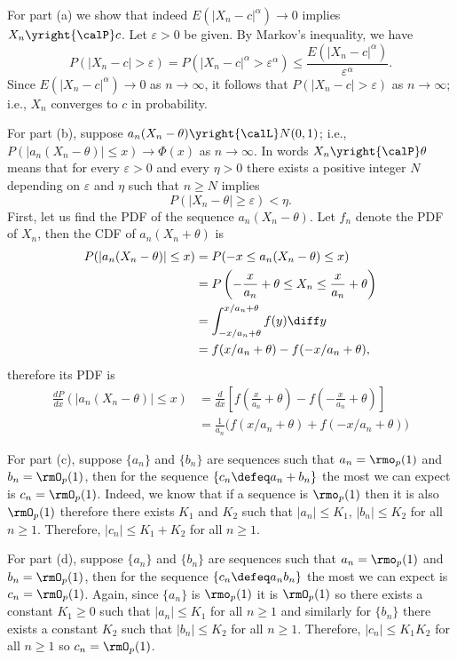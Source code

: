 \begin{solution}
  For part (a) we show that indeed \(E(|X_n-c|^\alpha)\to 0\) implies
  \(X_n\yright{\calP}c\). Let \(\varepsilon>0\) be given. By Markov's
  inequality, we have
  \[
    P(|X_n-c|>\varepsilon)=
    P(|X_n-c|^\alpha>\varepsilon^\alpha)
    \leq\frac{E(|X_n-c|^\alpha)}{\varepsilon^\alpha}.
  \]
  Since \(E(|X_n-c|^\alpha)\to 0\) as \(n\to\infty\), it follows that
  \(P(|X_n-c|>\varepsilon)\) as \(n\to\infty\); i.e., \(X_n\) converges to
  \(c\) in probability.

  For part (b), suppose \(a_n(X_n-\theta)\yright{\calL}N(0,1)\); i.e.,
  \(P(|a_n(X_n-\theta)|\leq x)\to\Phi(x)\) as \(n\to\infty\). In words
  \(X_n\yright{\calP}\theta\) means that for every \(\varepsilon>0\) and
  every \(\eta>0\) there exists a positive integer \(N\) depending on
  \(\varepsilon\) and \(\eta\) such that \(n\geq N\) implies
  \[
    P(|X_n-\theta|\geq\varepsilon)<\eta.
  \]
  First, let us find the PDF of the sequence \(a_n(X_n-\theta)\). Let \(f_n\)
  denote the PDF of \(X_n\), then the CDF of \(a_n(X_n+\theta)\) is
  \begin{align*}
    P(|a_n(X_n-\theta)|\leq x)
    &=P(-x\leq a_n(X_n-\theta)\leq x)\\
    &=P\left(-\frac{x}{a_n}+\theta\leq X_n\leq\frac{x}{a_n}+\theta\right)\\
    &=\int_{-x/a_n+\theta}^{x/a_n+\theta} f(y)\diff y\\
    &=f(x/a_n+\theta)
      -f(-x/a_n+\theta),
  \end{align*}
  therefore its PDF is
  \begin{align*}
    \frac{dP}{dx}(|a_n(X_n-\theta)|\leq x)
    &=\frac{d}{dx}
      \left[%
      f\left(\frac{x}{a_n}+\theta\right)%
      -f\left(-\frac{x}{a_n}+\theta\right)%
      \right]\\
    &=\frac{1}{a_n}\bigl(f(x/a_n+\theta)+f(-x/a_n+\theta)\bigr)
  \end{align*}

  For part (c), suppose \(\{a_n\}\) and \(\{b_n\}\) are sequences such that
  \(a_n=\rmo_p(1)\) and \(b_n=\rmO_p(1)\), then for the sequence
  \(\{c_n\defeq a_n+b_n\}\) the most we can expect is
  \(c_n=\rmO_p(1)\). Indeed, we know that if a sequence is \(\rmo_p(1)\)
  then it is also \(\rmO_p(1)\) therefore there exists \(K_1\) and \(K_2\)
  such that \(|a_n|\leq K_1\), \(|b_n|\leq K_2\) for all \(n\geq
  1\). Therefore, \(|c_n|\leq K_1+K_2\) for all \(n\geq 1\).

  For part (d), suppose \(\{a_n\}\) and \(\{b_n\}\) are sequences such that
  \(a_n=\rmo_p(1)\) and \(b_n=\rmO_p(1)\), then for the sequence
  \(\{c_n\defeq a_nb_n\}\) the most we can expect is
  \(c_n=\rmO_p(1)\). Again, since \(\{a_n\}\) is \(\rmo_p(1)\) it is
  \(\rmO_p(1)\) so there exists a constant \(K_1\geq 0\) such that
  \(|a_n|\leq K_1\) for all \(n\geq 1\) and similarly for \(\{b_n\}\) there
  exists a constant \(K_2\) such that \(|b_n|\leq K_2\) for all
  \(n\geq 1\). Therefore, \(|c_n|\leq K_1K_2\) for all \(n\geq 1\) so
  \(c_n=\rmO_p(1)\).


\end{solution}
